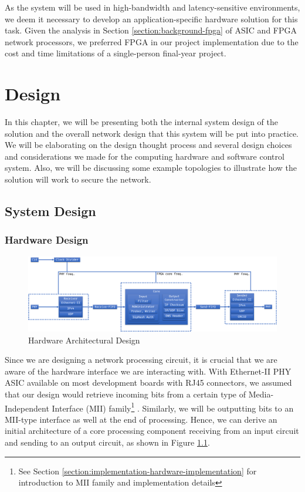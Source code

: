 \documentclass[a4paper]{report}
\begin{document}
As the system will be used in high-bandwidth and latency-sensitive environments, we deem it necessary to develop an application-specific hardware solution for this task. Given the analysis in Section \ref{section:background-fpga} of ASIC and FPGA network processors, we preferred FPGA in our project implementation due to the cost and time limitations of a single-person final-year project.


\chapter{Design}

In this chapter, we will be presenting both the internal system design of the solution and the overall network design that this system will be put into practice. We will be elaborating on the design thought process and several design choices and considerations we made for the computing hardware and software control system. Also, we will be discussing some example topologies to illustrate how the solution will work to secure the network.

\section{System Design}

\subsection{Hardware Design}

\begin{figure}[h!]
  \includegraphics[width=\textwidth]{imgs/hardware-design.png}
  \caption{Hardware Architectural Design}
  \label{fig:hardware-design}
\end{figure}

Since we are designing a network processing circuit, it is crucial that we are aware of the hardware interface we are interacting with. With Ethernet-II PHY ASIC available on most development boards with RJ45 connectors, we assumed that our design would retrieve incoming bits from a certain type of Media-Independent Interface (MII) family\footnote{See Section \ref{section:implementation-hardware-implementation} for introduction to MII family and implementation details} \cite{}. Similarly, we will be outputting bits to an MII-type interface as well at the end of processing. Hence, we can derive an initial architecture of a core processing component receiving from an input circuit and sending to an output circuit, as shown in Figure \ref{fig:hardware-design}.
\end{document}
